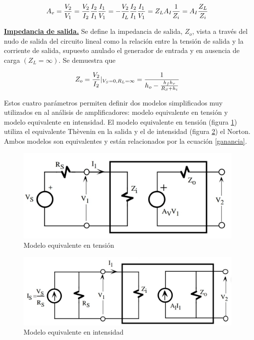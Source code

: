 \documentclass[12pt, a4paper]{article}
\begin{document}
    \begin{equation}
        A_v = {V_2 \over V_1} = {V_2 \over I_2}{I_2 \over I_1}{I_1 \over V_1} = -{V_2 \over I_L}{I_2 \over I_1}{I_1 \over V_1} = Z_LA_I{1 \over Z_i} = A_I{Z_L \over Z_i}
        \label{ganancia}
    \end{equation}

    \underline{\bf Impedancia de salida.} Se define la impedancia de salida, $Z_o$, vista a través del nudo de salida del circuito lineal como la relación entre la tensión de salida y la corriente de salida, supuesto anulado el generador de entrada y en ausencia de carga $(Z_L = \infty)$. Se demuestra que

    $$Z_o = {V_2 \over I_2}|_{V_S = 0, R_L = \infty} = \frac{1}{h_o - {h_fh_r \over R_S + h_i}}$$

    Estos cuatro parámetros permiten definir dos modelos simplificados muy utilizados en al análisis de amplificadores: modelo equivalente en tensión y modelo equivalente en intensidad. El modelo equivalente en tensión (figura \ref{fig:mod-ten}) utiliza el equivalente Thèvenin en la salida y el de intensidad (figura \ref{fig:mod-int}) el Norton. Ambos modelos son equivalentes y están relacionados por la ecuación \ref{ganancia}.

    \begin{figure}[h!]
        \centering
        \includegraphics[height=4cm\textwidth]{mod-ten.jpg}
        \caption{Modelo equivalente en tensión}
        \label{fig:mod-ten}
    \end{figure}

    \begin{figure}[h!]
        \centering
        \includegraphics[height=4cm\textwidth]{mod-int.jpg}
        \caption{Modelo equivalente en intensidad}
        \label{fig:mod-int}
    \end{figure}
\end{document}
